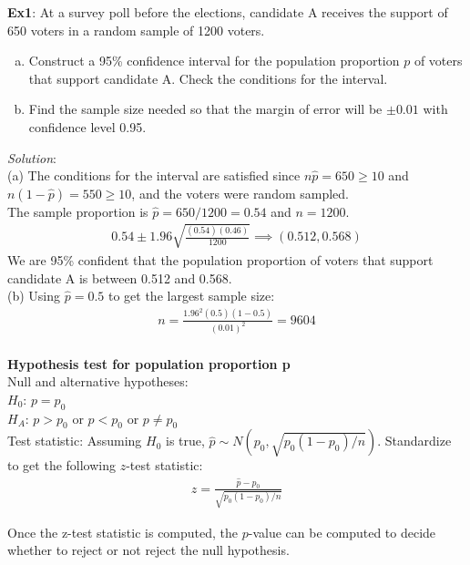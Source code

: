 \documentclass[fleqn, 11pt]{article}\usepackage[]{graphicx}\usepackage[]{color}
\begin{document}
\textbf{Ex1}:  At a survey poll before the elections, candidate A receives the support of 650 voters in a random sample of 1200 voters.  
\begin{enumerate}[(a)]
\item Construct a 95\% confidence interval for the population proportion $p$ of voters that support candidate A.  Check the conditions for the interval.
\item Find the sample size needed so that the margin of error will be $\pm 0.01$ with confidence level 0.95.
\end{enumerate}
{\color{blue}
\emph{Solution}:\\
(a) The conditions for the interval are satisfied since $n\hat{p} = 650 \geq 10$ and $n(1-\hat{p}) = 550 \geq 10$, and the voters were random sampled.\\

The sample proportion is $\hat{p} = 650/1200 = 0.54$ and $n=1200$.
\begin{align*}
0.54 \pm 1.96 \sqrt{\frac{(0.54)(0.46)}{1200}} \implies (0.512, 0.568)
\end{align*}
We are 95\% confident that the population proportion of voters that support candidate A is between 0.512 and 0.568.\\

(b) Using $\hat{p} = 0.5$ to get the largest sample size:
\begin{align*}
n = \frac{1.96^2 (0.5)(1-0.5)}{(0.01)^2} = 9604\\
\end{align*}
}
\newpage

\textbf{Hypothesis test for population proportion p}\\

Null and alternative hypotheses:\\
$H_0$: $p = p_0$\\
$H_A$: $p > p_0$ or $p < p_0$ or $p \neq p_0$\\

Test statistic:  Assuming $H_0$ is true, $\hat{p} \sim N(p_0, \sqrt{p_0 (1-p_0)/n})$.  Standardize to get the following $z$-test statistic:
\begin{align*}
z = \frac{\hat{p} - p_0}{\sqrt{p_0 (1-p_0)/n}}
\end{align*}

Once the z-test statistic is computed, the $p$-value can be computed to decide whether to reject or not reject the null hypothesis.\\
\end{document}
